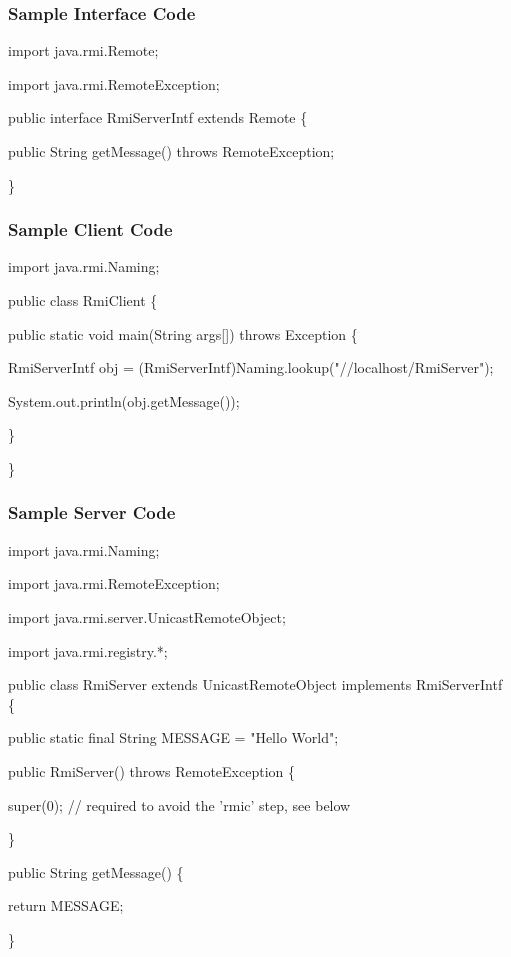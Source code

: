 \documentclass{beamer}
\begin{document}
      
 
    \begin{frame}
    	\frametitle{Sample Interface Code}

    	\begin{example}
    	import java.rmi.Remote;
    	
    	import java.rmi.RemoteException;
    	
    	public interface RmiServerIntf extends Remote \{
    	
    	public String getMessage() throws RemoteException;
    	
    	\}
        \end{example}	
    \end{frame}           
    \begin{frame}
    	\frametitle{Sample Client Code}

    	\begin{example}
import java.rmi.Naming;

public class RmiClient \{
 
	public static void main(String args[]) throws Exception \{

		RmiServerIntf obj = (RmiServerIntf)Naming.lookup("//localhost/RmiServer");

		System.out.println(obj.getMessage()); 

	\}

\}
    	\end{example}	
    \end{frame}            
    \begin{frame}
    	\frametitle{Sample Server Code}

    	\begin{example}
import java.rmi.Naming;

import java.rmi.RemoteException;

import java.rmi.server.UnicastRemoteObject;

import java.rmi.registry.*; 

public class RmiServer extends UnicastRemoteObject implements RmiServerIntf \{

	public static final String MESSAGE = "Hello World";
	
	public RmiServer() throws RemoteException \{
	
		super(0);    // required to avoid the 'rmic' step, see below

	\}
	
	public String getMessage() \{

		return MESSAGE;

	\}
    	\end{example}	
    \end{frame}  
\end{document}
